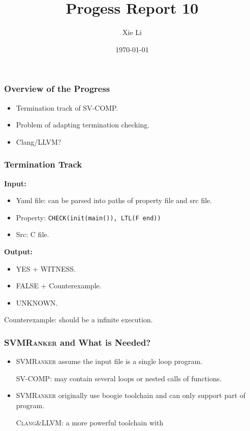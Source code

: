 \documentclass[11pt]{beamer}
\title{Progess Report 10}
\date{\today}
\author{Xie Li}
\begin{document}
\maketitle

\begin{frame}\frametitle{Overview of the Progress}
\begin{itemize}
\item Termination track of SV-COMP.
\item Problem of adapting termination checking.
\item Clang/LLVM?
\end{itemize}

\end{frame}

\begin{frame}\frametitle{Termination Track}

\textbf{Input: }
\begin{itemize}

\item Yaml file: can be parsed into paths of property file and src file.

\item 
Property: \texttt{CHECK(init(main()), LTL(F end))}

\item Src: C file.
\end{itemize}

\textbf{Output: }
\begin{itemize}
\item YES + WITNESS.
\item FALSE + Counterexample.
\item UNKNOWN.
\end{itemize}



Counterexample: should be a infinite execution.



\end{frame}


\begin{frame}\frametitle{ \textsc{SVMRanker} and What is Needed?}

\begin{itemize}
\item 
\textsc{SVMRanker}  assume the input file is a single loop program.

\textsc{SV-COMP}: may contain several loops or nested calls of functions. 
\item 
\textsc{SVMRanker} originally use boogie toolchain and can only support part of program.

\textsc{Clang\&LLVM}: a more powerful toolchain with 
\end{itemize} 
\end{frame}
\end{document}
